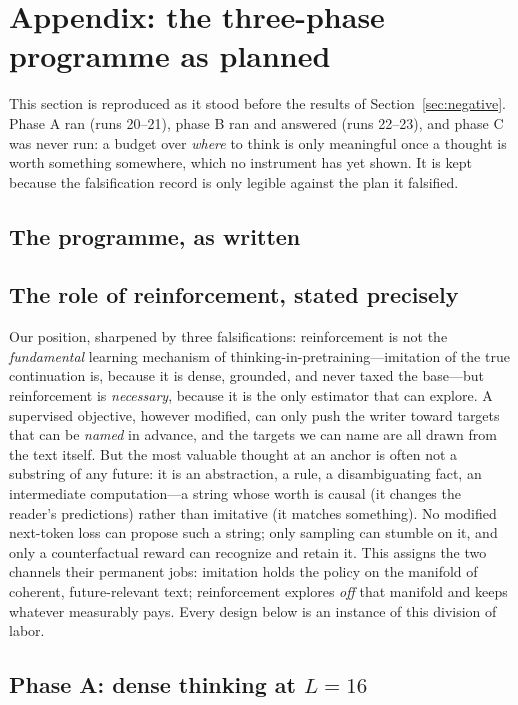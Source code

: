\documentclass{article} %
\begin{document}
\section{Appendix: the three-phase programme as planned}
\label{app:programme}

This section is reproduced as it stood before the results of Section~\ref{sec:negative}. Phase A ran (runs 20--21), phase B ran and answered (runs 22--23), and phase C was never run: a budget over \emph{where} to think is only meaningful once a thought is worth something somewhere, which no instrument has yet shown. It is kept because the falsification record is only legible against the plan it falsified.

\subsection{The programme, as written}
\label{sec:programme}

\subsection{The role of reinforcement, stated precisely}
\label{sec:role}
 Our position, sharpened by three falsifications: reinforcement is not the \emph{fundamental} learning mechanism of thinking-in-pretraining---imitation of the true continuation is, because it is dense, grounded, and never taxed the base---but reinforcement is \emph{necessary}, because it is the only estimator that can explore. A supervised objective, however modified, can only push the writer toward targets that can be \emph{named} in advance, and the targets we can name are all drawn from the text itself. But the most valuable thought at an anchor is often not a substring of any future: it is an abstraction, a rule, a disambiguating fact, an intermediate computation---a string whose worth is causal (it changes the reader's predictions) rather than imitative (it matches something). No modified next-token loss can propose such a string; only sampling can stumble on it, and only a counterfactual reward can recognize and retain it. This assigns the two channels their permanent jobs: imitation holds the policy on the manifold of coherent, future-relevant text; reinforcement explores \emph{off} that manifold and keeps whatever measurably pays. Every design below is an instance of this division of labor.

\subsection{Phase A: dense thinking at $L{=}16$}
\label{sec:phaseA}
\end{document}
